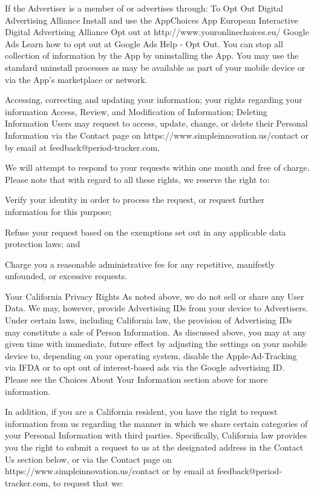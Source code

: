 If the Advertiser is a member of or advertises through:	 To Opt Out
 Digital Advertising Alliance	 Install and use the AppChoices App
 European Interactive Digital Advertising Alliance	 Opt out at http://www.youronlinechoices.eu/
 Google Ads	 Learn how to opt out at Google Ads Help - Opt Out.
You can stop all collection of information by the App by uninstalling the App. You may use the standard uninstall processes as may be available as part of your mobile device or via the App’s marketplace or network.

Accessing, correcting and updating your information; your rights regarding your information
Access, Review, and Modification of Information; Deleting Information
Users may request to access, update, change, or delete their Personal Information via the Contact page on https://www.simpleinnovation.us/contact or by email at feedback@period-tracker.com. 

We will attempt to respond to your requests within one month and free of charge. Please note that with regard to all these rights, we reserve the right to:

Verify your identity in order to process the request, or request further information for this purpose;

Refuse your request based on the exemptions set out in any applicable data protection laws; and

Charge you a reasonable administrative fee for any repetitive, manifestly unfounded, or excessive requests.

Your California Privacy Rights
As noted above, we do not sell or share any User Data. We may, however, provide Advertising IDs from your device to Advertisers. Under certain laws, including California law, the provision of Advertising IDs may constitute a sale of Person Information. As discussed above, you may at any given time with immediate, future effect by adjusting the settings on your mobile device to, depending on your operating system, disable the Apple-Ad-Tracking via IFDA or to opt out of interest-based ads via the Google advertising ID. Please see the Choices About Your Information section above for more information.

In addition, if you are a California resident, you have the right to request information from us regarding the ‎manner in which we share certain categories of your Personal Information with third parties. ‎Specifically, California law provides you the right to submit a request to us at the designated address in the Contact Us section below, or via the Contact page on https://www.simpleinnovation.us/contact or by email at feedback@period-tracker.com, to ‎request that we:‎

